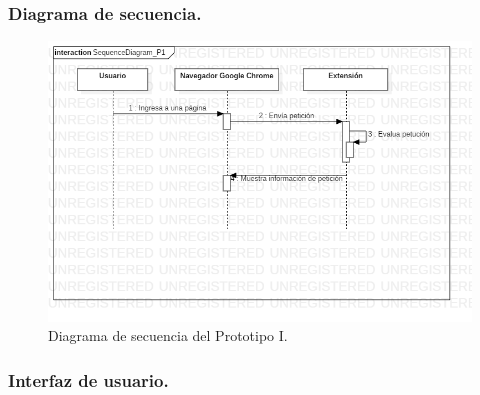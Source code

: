 \documentclass[12pt, a4paper, titlepage]{article}
\begin{document}
			\subsubsection{Diagrama de secuencia.}
		    	\begin{figure}[!htb]
				    \begin{center}
			            \includegraphics[width=15cm]{./imagenes/SequenceDiagram_P1.png}
				        \caption{Diagrama de secuencia del Prototipo I.}
			        \end{center}
			    \end{figure}
			\subsubsection{Interfaz de usuario.}
\end{document}
